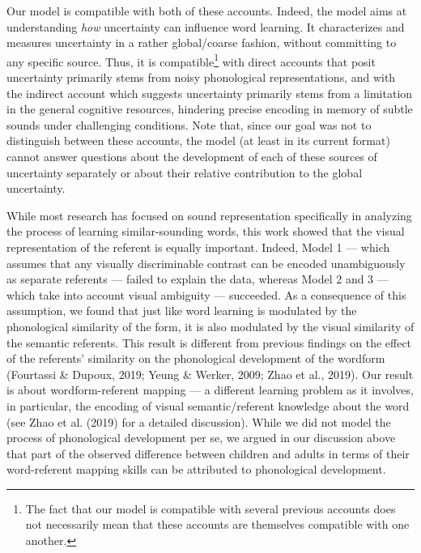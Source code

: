 \documentclass[english,,man]{apa6}
\let\rmarkdownfootnote\footnote%
\def\footnote{\protect\rmarkdownfootnote}
\begin{document}
Our model is compatible with both of these accounts. Indeed, the model aims at understanding \emph{how} uncertainty can influence word learning. It characterizes and measures uncertainty in a rather global/coarse fashion, without committing to any specific source. Thus, it is compatible\footnote{The fact that our model is compatible with several previous accounts does not necessarily mean that these accounts are themselves compatible with one another.} with direct accounts that posit uncertainty primarily stems from noisy phonological representations, and with the indirect account which suggests uncertainty primarily stems from a limitation in the general cognitive resources, hindering precise encoding in memory of subtle sounds under challenging conditions. Note that, since our goal was not to distinguish between these accounts, the model (at least in its current format) cannot answer questions about the development of each of these sources of uncertainty separately or about their relative contribution to the global uncertainty.

While most research has focused on sound representation specifically in analyzing the process of learning similar-sounding words, this work showed that the visual representation of the referent is equally important. Indeed, Model 1 --- which assumes that any visually discriminable contrast can be encoded unambiguously as separate referents --- failed to explain the data, whereas Model 2 and 3 --- which take into account visual ambiguity --- succeeded. As a consequence of this assumption, we found that just like word learning is modulated by the phonological similarity of the form, it is also modulated by the visual similarity of the semantic referents. This result is different from previous findings on the effect of the referents' similarity on the phonological development of the wordform (Fourtassi \& Dupoux, 2019; Yeung \& Werker, 2009; Zhao et al., 2019). Our result is about wordform-referent mapping --- a different learning problem as it involves, in particular, the encoding of visual semantic/referent knowledge about the word (see Zhao et al. (2019) for a detailed discussion). While we did not model the process of phonological development per se, we argued in our discussion above that part of the observed difference between children and adults in terms of their word-referent mapping skills can be attributed to phonological development.
\end{document}
